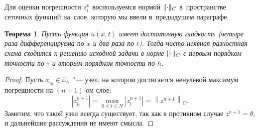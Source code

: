 \documentclass[11pt,a4paper,twoside]{report}
\numberwithin{equation}{section}
\theoremstyle{definition}
\theoremstyle{plain}
\newtheorem*{theorem*}{Теорема}
\DeclarePairedDelimiter\norm{\lVert}{\rVert}
\begin{document}
Для оценки погрешности $z_i^n$ воспользуемся нормой $\norm{\cdot}_C$
в~пространстве сеточных функций на~слое, которую мы ввели в~предыдущем
параграфе.
%
\begin{theorem*}
%
    Пусть функция $u(x, t)$ имеет достаточную гладкость (четыре раза дифференцируема
    по $x$ и два раза по $t$). Тогда чисто неявная разностная схема сходится к решению
    исходной задачи в норме $\norm{\cdot}_C$ с первым порядком точности по $\tau$ и
    вторым порядком точности по $h$.
%
\end{theorem*}
%
%
\begin{proof}
%
Пусть $x_{i_0}\in \overline{\omega}_h$~"--- узел, на котором
достигается ненулевой максимум погрешности на $(n+1)$-ом слое:
%
$$
    \left|z_{i_0}^{n+1}\right| = \max_{0 \leqslant i \leqslant N} \left|z_i^{n+1}\right| = \left\|z^{n+1}\right\|_C.
$$
%
Заметим, что такой узел всегда существует, так как в противном случае
$z^{n+1} = \theta$, и дальнейшие рассуждения не имеют смысла.


\end{proof}
\end{document}
